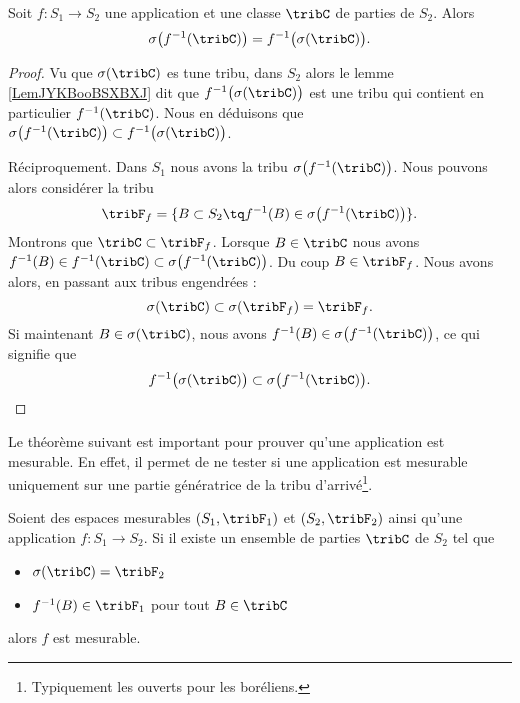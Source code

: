 \begin{lemma}       \label{LemOQTBooWGYuDU}
    Soit \( f\colon S_1\to S_2\) une application et une classe \( \tribC\) de parties de \( S_2\). Alors
    \begin{equation}
        \sigma\big( f^{-1}(\tribC) \big)=f^{-1}\big( \sigma(\tribC) \big).
    \end{equation}
\end{lemma}

\begin{proof}
    Vu que \( \sigma(\tribC)\) es tune tribu, dans \( S_2\) alors le lemme \ref{LemJYKBooBSXBXJ} dit que \( f^{-1}\big( \sigma(\tribC) \big)\) est une tribu qui contient en particulier \(  f^{-1}(\tribC) \). Nous en déduisons que \( \sigma\big( f^{-1}(\tribC) \big)\subset f^{-1}\big( \sigma(\tribC) \big)\).

    Réciproquement. Dans \( S_1\) nous avons la tribu \( \sigma\big( f^{-1}(\tribC) \big)\). Nous pouvons alors considérer la tribu
    \begin{equation}
        \tribF_f=\{ B\subset S_2\tq f^{-1}(B)\in\sigma\big( f^{-1}(\tribC) \big) \}.
    \end{equation}
    Montrons que \( \tribC\subset \tribF_f\). Lorsque \( B\in \tribC\) nous avons \( f^{-1}(B)\in f^{-1}(\tribC)\subset\sigma\big( f^{-1}(\tribC) \big)\). Du coup \( B\in \tribF_f\). Nous avons alors, en passant aux tribus engendrées :
    \begin{equation}
        \sigma(\tribC)\subset\sigma(\tribF_f)=\tribF_f.
    \end{equation}
    Si maintenant \( B\in\sigma(\tribC)\), nous avons \( f^{-1}(B)\in \sigma\big( f^{-1}(\tribC) \big)\), ce qui signifie que
    \begin{equation}
        f^{-1}\big( \sigma(\tribC) \big)\subset\sigma\big( f^{-1}(\tribC) \big).
    \end{equation}
\end{proof}

Le théorème suivant est important pour prouver qu'une application est mesurable. En effet, il permet de ne tester si une application est mesurable uniquement sur une partie génératrice de la tribu d'arrivé\footnote{Typiquement les ouverts pour les boréliens.}.
\begin{theorem}     \label{ThoECVAooDUxZrE}
    Soient des espaces mesurables \( ( S_1,\tribF_1 )\) et \( (S_2,\tribF_2)\) ainsi qu'une application \( f\colon S_1\to S_2\). Si il existe un ensemble de parties \( \tribC\) de \( S_2\) tel que
    \begin{itemize}
        \item \( \sigma(\tribC)=\tribF_2\)
        \item \( f^{-1}(B) \in \tribF_1 \) pour tout \( B\in \tribC\)
    \end{itemize}
    alors \( f\) est mesurable.
\end{theorem}

